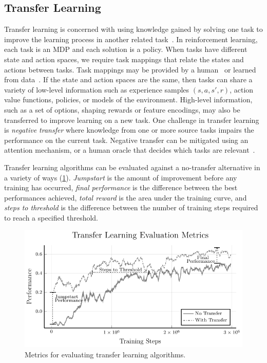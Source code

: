 \subsection{Transfer Learning}
Transfer learning is concerned with using knowledge gained by solving one task to improve the learning process in another related task~\cite{taylor2009transfer}. In reinforcement learning, each task is an MDP and each solution is a policy. When tasks have different state and action spaces, we require task mappings that relate the states and actions between tasks. Task mappings may be provided by a human~\cite{taylor2007transfer} or learned from data~\cite{taylor2008autonomous}. If the state and action spaces are the same, then tasks can share a variety of low-level information such as experience samples $(s, a, s', r)$, action value functions, policies, or models of the environment. High-level information, such as a set of options, shaping rewards or feature encodings, may also be transferred to improve learning on a new task. One challenge in transfer learning is \emph{negative transfer} where knowledge from one or more source tasks impairs the performance on the current task. Negative transfer can be mitigated using an attention mechanism, or a human oracle that decides which tasks are relevant~\cite{taylor2009transfer}. 

Transfer learning algorithms can be evaluated against a no-transfer alternative in a variety of ways (\cref{fig:transfer_metrics}). \emph{Jumpstart} is the amount of improvement before any training has occurred, \emph{final performance} is the difference between the best performances achieved, \emph{total reward} is the area under the training curve,  and \emph{steps to threshold} is the difference between the number of training steps required to reach a specified threshold.

\begin{figure}
\centering
\includegraphics[width=0.8\linewidth]{figures/iterative_validation/transfer_metrics}
\caption{Metrics for evaluating transfer learning algorithms. }
\label{fig:transfer_metrics}
\end{figure}

